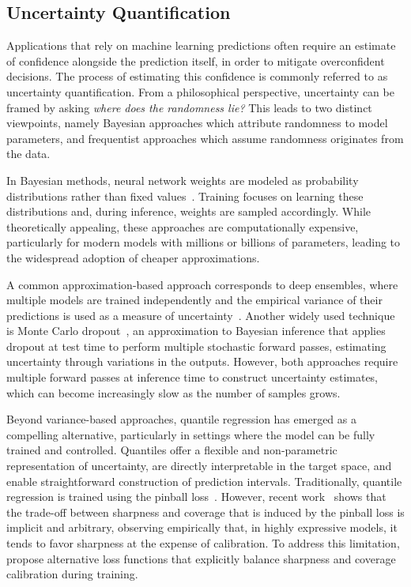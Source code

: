 \documentclass[11pt]{article}
\begin{document}
\vspace{-0.13cm}
\subsection{Uncertainty Quantification}
\vspace{-0.13cm}

Applications that rely on machine learning predictions often require an estimate of confidence alongside the prediction itself, in order to mitigate overconfident decisions. The process of estimating this confidence is commonly referred to as uncertainty quantification. From a philosophical perspective, uncertainty can be framed by asking \emph{where does the randomness lie?} This leads to two distinct viewpoints, namely Bayesian approaches which attribute randomness to model parameters, and frequentist approaches which assume randomness originates from the data.

In Bayesian methods, neural network weights are modeled as probability distributions rather than fixed values~\cite{mackay1992bayesian,welling2011bayesian,tran2019bayesian}. Training focuses on learning these distributions and, during inference, weights are sampled accordingly. While theoretically appealing, these approaches are computationally expensive, particularly for modern models with millions or billions of parameters, leading to the widespread adoption of cheaper approximations.

A common approximation-based approach corresponds to deep ensembles, where multiple models are trained independently and the empirical variance of their predictions is used as a measure of uncertainty~\cite{lakshminarayanan2017simple,pearce2020uncertainty,zhan2023test}. Another widely used technique is Monte Carlo dropout~\cite{gal2016dropout,glushkova2021uncertainty}, an approximation to Bayesian inference that applies dropout at test time to perform multiple stochastic forward passes, estimating uncertainty through variations in the outputs. However, both approaches require multiple forward passes at inference time to construct uncertainty estimates, which can become increasingly slow as the number of samples grows.

Beyond variance-based approaches, quantile regression has emerged as a compelling alternative, particularly in settings where the model can be fully trained and controlled. Quantiles offer a flexible and non-parametric representation of uncertainty, are directly interpretable in the target space, and enable straightforward construction of prediction intervals. Traditionally, quantile regression is trained using the pinball loss~\cite{koenker2001quantile}. However, recent work~\cite{chung2021beyond} shows that the trade-off between sharpness and coverage that is induced by the pinball loss is implicit and arbitrary, observing empirically that, in highly expressive models, it tends to favor sharpness at the expense of calibration. To address this limitation, \citet{chung2021beyond} propose alternative loss functions that explicitly balance sharpness and coverage calibration during training. 
\end{document}

